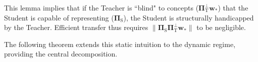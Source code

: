 \documentclass{article}
\theoremstyle{definition}
\theoremstyle{definition}
\theoremstyle{plain}
\theoremstyle{plain}
\theoremstyle{plain}
\newtheorem{lemma}{Lemma}
\theoremstyle{plain}
\theoremstyle{plain}
\newcommand{\bs}[1]{\boldsymbol{\mathbf{#1}}}
\newcommand{\te}{\mathrm{T}}
\newcommand{\st}{\mathrm{S}}
\newcommand{\ts}{\mathrm{T2S}}
\newcommand{\w}{\mathbf{w}}
\begin{document}
This lemma implies that if the Teacher is ``blind" to concepts ($\mathbf{\Pi}_\te^\perp \w_*$) that the Student is capable of representing ($\mathbf{\Pi}_\st$), the Student is structurally handicapped by the Teacher. Efficient transfer thus requires $\|\mathbf{\Pi}_\st \mathbf{\Pi}_\te^\perp \mathbf{w}_*\|$ to be negligible.

The following theorem extends this static intuition to the dynamic regime, providing the central decomposition.



\end{document}

